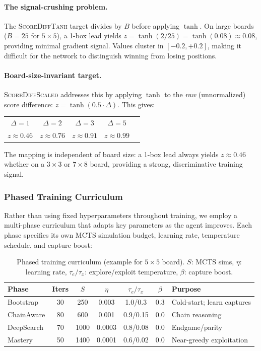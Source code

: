 \documentclass[11pt]{article}
\begin{document}
\paragraph{The signal-crushing problem.}
The \textsc{ScoreDiffTanh} target divides by $B$ before applying $\tanh$.
On large boards ($B = 25$ for $5{\times}5$), a 1-box lead yields
$z = \tanh(2/25) = \tanh(0.08) \approx 0.08$, providing minimal gradient
signal. Values cluster in $[-0.2, +0.2]$, making it difficult for the
network to distinguish winning from losing positions.

\paragraph{Board-size-invariant target.}
\textsc{ScoreDiffScaled} addresses this by applying $\tanh$ to the
\emph{raw} (unnormalized) score difference:
$z = \tanh(0.5 \cdot \Delta)$. This gives:
\begin{center}
\begin{tabular}{ccccc}
$\Delta=1$ & $\Delta=2$ & $\Delta=3$ & $\Delta=5$ \\
$z \approx 0.46$ & $z \approx 0.76$ & $z \approx 0.91$ & $z \approx 0.99$
\end{tabular}
\end{center}
The mapping is independent of board size: a 1-box lead always yields
$z \approx 0.46$ whether on a $3{\times}3$ or $7{\times}8$ board,
providing a strong, discriminative training signal.

\subsubsection{Phased Training Curriculum}
\label{sec:curriculum}

Rather than using fixed hyperparameters throughout training, we employ a
multi-phase curriculum that adapts key parameters as the agent improves.
Each phase specifies its own MCTS simulation budget, learning rate,
temperature schedule, and capture boost:

\begin{table}[t]
\centering
\caption{Phased training curriculum (example for $5{\times}5$ board).
$S$: MCTS sims, $\eta$: learning rate, $\tau_e/\tau_x$: explore/exploit
temperature, $\beta$: capture boost.}
\label{tab:phases}
\begin{tabular}{lcccccl}
\toprule
Phase & Iters & $S$ & $\eta$ & $\tau_e/\tau_x$ & $\beta$ & Purpose \\
\midrule
Bootstrap   & 30 & 250  & 0.003    & 1.0/0.3  & 0.3 & Cold-start; learn captures \\
ChainAware  & 80 & 600  & 0.001    & 0.9/0.15 & 0.0 & Chain reasoning \\
DeepSearch  & 70 & 1000 & 0.0003   & 0.8/0.08 & 0.0 & Endgame/parity \\
Mastery     & 50 & 1400 & 0.0001   & 0.6/0.02 & 0.0 & Near-greedy exploitation \\
\bottomrule
\end{tabular}
\end{table}
\end{document}
